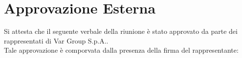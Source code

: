 \section{Approvazione Esterna}
Si attesta che il seguente verbale della riunione è stato approvato da parte dei rappresentati di Var Group S.p.A..\\
Tale approvazione è comporvata dalla presenza della firma del rappresentante:\\
